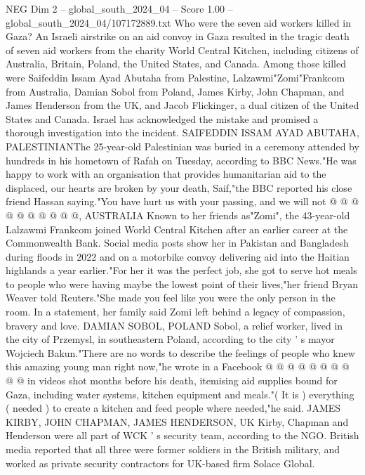 \begin{textsample}{NEG Dim 2 – global\_south\_2024\_04 – Score 1.00 – global\_south\_2024\_04/107172889.txt}  \label{ex:f2_neg_400}
Who were the seven aid workers killed in Gaza?
An Israeli airstrike on an aid convoy in Gaza resulted in the tragic death of seven aid workers from the charity World Central Kitchen, including citizens of Australia, Britain, Poland, the United States, and Canada.
Among those killed were Saifeddin Issam Ayad Abutaha from Palestine, Lalzawmi"Zomi"Frankcom from Australia, Damian Sobol from Poland, James Kirby, John Chapman, and James Henderson from the UK, and Jacob Flickinger, a dual citizen of the United States and Canada.
Israel has acknowledged the mistake and promised a thorough investigation into the incident.
SAIFEDDIN ISSAM AYAD ABUTAHA, PALESTINIANThe 25-year-old Palestinian was buried in a ceremony attended by hundreds in his hometown of Rafah on Tuesday, according to BBC News."He was happy to work with an organisation that provides humanitarian aid to the displaced, our hearts are broken by your death, Saif,"the BBC reported his close friend Hassan saying."You have hurt us with your passing, and we will not @ @ @ @ @ @ @ @ @ @, AUSTRALIA Known to her friends as"Zomi", the 43-year-old Lalzawmi Frankcom joined World Central Kitchen after an earlier career at the Commonwealth Bank.
Social media posts show her in Pakistan and Bangladesh during floods in 2022 and on a motorbike convoy delivering aid into the Haitian highlands a year earlier."For her it was the perfect job, she got to serve hot meals to people who were having maybe the lowest point of their lives,"her friend Bryan Weaver told Reuters."She made you feel like you were the only person in the room.
In a statement, her family said Zomi left behind a legacy of compassion, bravery and love.
DAMIAN SOBOL, POLAND Sobol, a relief worker, lived in the city of Przemysl, in southeastern Poland, according to the city ' s mayor Wojciech Bakun."There are no words to describe the feelings of people who knew this amazing young man right now,"he wrote in a Facebook @ @ @ @ @ @ @ @ @ @ in videos shot months before his death, itemising aid supplies bound for Gaza, including water systems, kitchen equipment and meals."( It is ) everything ( needed ) to create a kitchen and feed people where needed,"he said.
JAMES KIRBY, JOHN CHAPMAN, JAMES HENDERSON, UK Kirby, Chapman and Henderson were all part of WCK ' s security team, according to the NGO.
British media reported that all three were former soldiers in the British military, and worked as private security contractors for UK-based firm Solace Global.

\end{textsample}
